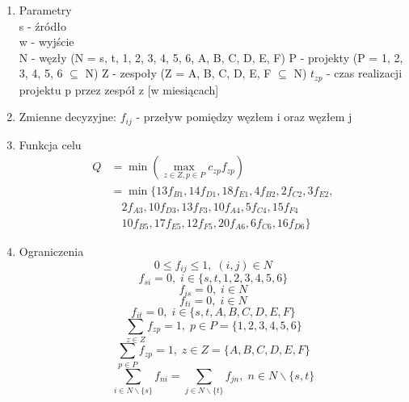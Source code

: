\begin{enumerate}
\item Parametry \\
s - źródło \\
w - wyjście \\
N - węzły (N = {s, t, 1, 2, 3, 4, 5, 6, A, B, C, D, E, F})
P - projekty (P = {1, 2, 3, 4, 5, 6} $\subseteq$ N)
Z - zespoły (Z = {A, B, C, D, E, F} $\subseteq$ N)
$t_{zp}$  - czas realizacji projektu p przez zespół z [w miesiącach]

\item Zmienne decyzyjne:
$f_{ij}$ - przeływ pomiędzy węzłem i oraz węzłem j
\item Funkcja celu
\begin{align*}
    Q &= \min \left( \max_{z \in Z, p \in P} c_{zp} f_{zp} \right) \\
    &= \min \big\{13f_{B1}, 14f_{D1}, 18f_{E1}, 4f_{B2}, 2f_{C2}, 3f_{E2}, \\
    &\quad  2f_{A3}, 10f_{D3},13f_{F3}, 10f_{A4}, 5f_{C4}, 15f_{F4} \\
    &\quad 10f_{B5}, 17f_{E5}, 12f_{F5}, 20f_{A6}, 6f_{C6}, 16f_{D6} \big\}
\end{align*}


\item Ograniczenia
\setcounter{equation}{0}
\begin{equation}
0 \leq f_{ij} \leq 1, \; (i, j) \in N
\end{equation}
\begin{equation}
f_{si} = 0, \; i \in \{ s, t, 1, 2, 3, 4, 5, 6 \}
\end{equation}
\begin{equation}
f_{is} = 0, \; i \in N
\end{equation}
\begin{equation}
f_{ti} = 0, \; i \in N
\end{equation}
\begin{equation}
f_{it} = 0, \; i \in \{s, t, A, B, C, D, E, F\}
\end{equation}
\begin{equation}
\sum_{z \in Z} f_{zp} = 1, \; p \in P = \{ 1, 2, 3, 4, 5, 6 \}
\end{equation} 
\begin{equation}
\sum_{p \in P} f_{zp} = 1, \; z \in Z = \{ A, B, C, D, E, F \}
\end{equation}
\begin{equation}
\sum_{i \in N \backslash \{s\}} f_{ni} = \sum_{j \in N \backslash \{t\}} f_{jn}, \; n \in N \backslash \{ s, t \}
\end{equation}

\end{enumerate}
